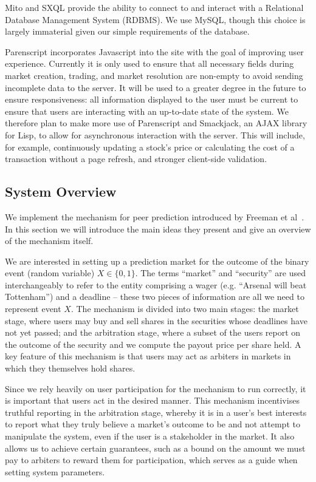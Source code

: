 \documentclass[10pt,a4paper]{article}
\theoremstyle{plain}
\theoremstyle{definition}
\begin{document}
Mito and SXQL provide the ability to connect to and interact with a Relational
Database Management System (RDBMS). We use MySQL, though this choice is largely
immaterial given our simple requirements of the database.

Parenscript incorporates Javascript into the site with the goal of improving
user experience. Currently it is only used to ensure that all necessary fields
during market creation, trading, and market resolution are non-empty to avoid
sending incomplete data to the server. It will be used to a greater degree in
the future to ensure responsiveness: all information displayed to the user must
be current to ensure that users are interacting with an up-to-date state of the
system. We therefore plan to make more use of Parenscript and Smackjack, an
AJAX library for Lisp, to allow for asynchronous interaction with the server.
This will include, for example, continuously updating a stock's price or
calculating the cost of a transaction without a page refresh, and stronger
client-side validation.

\subsection{System Overview}

We implement the mechanism for peer prediction introduced by Freeman et
al~\cite{CODiPM}. In this section we will introduce the main ideas they present
and give an overview of the mechanism itself.

We are interested in setting up a prediction market for the outcome of the
binary event (random variable) $X \in \{0,1\}$. The terms ``market'' and
``security'' are used interchangeably to refer to the entity comprising a wager
(e.g. ``Arsenal will beat Tottenham'') and a deadline -- these two pieces of
information are all we need to represent event $X$. The mechanism is divided
into two main stages: the market stage, where users may buy and sell shares in
the securities whose deadlines have not yet passed; and the arbitration stage,
where a subset of the users report on the outcome of the security and we
compute the payout price per share held. A key feature of this mechanism is
that users may act as arbiters in markets in which they themselves hold shares.

Since we rely heavily on user participation for the mechanism to run correctly,
it is important that users act in the desired manner. This mechanism
incentivises truthful reporting in the arbitration stage, whereby it is in a
user's best interests to report what they truly believe a market's outcome to
be and not attempt to manipulate the system, even if the user is a stakeholder
in the market. It also allows us to achieve certain guarantees, such as a bound
on the amount we must pay to arbiters to reward them for participation, which
serves as a guide when setting system parameters.
\end{document}
